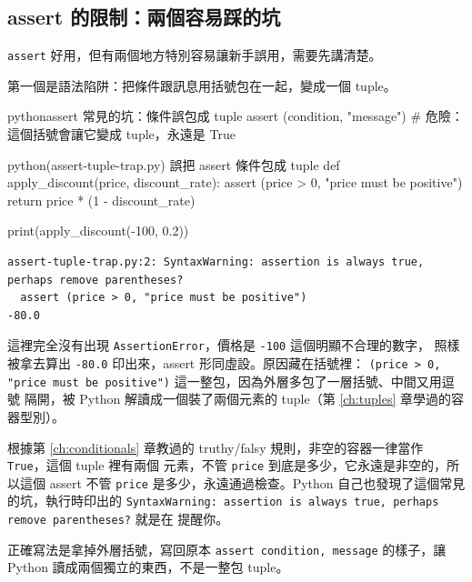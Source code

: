 \subsection*{assert 的限制：兩個容易踩的坑}

\texttt{assert} 好用，但有兩個地方特別容易讓新手誤用，需要先講清楚。

第一個是語法陷阱：把條件跟訊息用括號包在一起，變成一個 tuple。

\begin{code}{python}{assert 常見的坑：條件誤包成 tuple}
assert (condition, "message")   # 危險：這個括號會讓它變成 tuple，永遠是 True
\end{code}

\begin{example}{python}{(assert-tuple-trap.py) 誤把 assert 條件包成 tuple}
def apply_discount(price, discount_rate):
    assert (price > 0, "price must be positive")
    return price * (1 - discount_rate)

print(apply_discount(-100, 0.2))
\end{example}

\begin{verbatim}
assert-tuple-trap.py:2: SyntaxWarning: assertion is always true, perhaps remove parentheses?
  assert (price > 0, "price must be positive")
-80.0
\end{verbatim}

這裡完全沒有出現 \texttt{AssertionError}，價格是 \texttt{-100} 這個明顯不合理的數字，
照樣被拿去算出 \texttt{-80.0} 印出來，assert 形同虛設。原因藏在括號裡：
\texttt{(price > 0, "price must be positive")} 這一整包，因為外層多包了一層括號、中間又用逗號
隔開，被 Python 解讀成一個裝了兩個元素的 tuple（第 \ref{ch:tuples} 章學過的容器型別）。

根據第 \ref{ch:conditionals} 章教過的 truthy/falsy 規則，非空的容器一律當作 \texttt{True}，這個 tuple 裡有兩個
元素，不管 \texttt{price} 到底是多少，它永遠是非空的，所以這個 assert 不管 \texttt{price}
是多少，永遠通過檢查。Python 自己也發現了這個常見的坑，執行時印出的
\texttt{SyntaxWarning: assertion is always true, perhaps remove parentheses?} 就是在
提醒你。

正確寫法是拿掉外層括號，寫回原本 \texttt{assert condition, message} 的樣子，讓 Python
讀成兩個獨立的東西，不是一整包 tuple。


